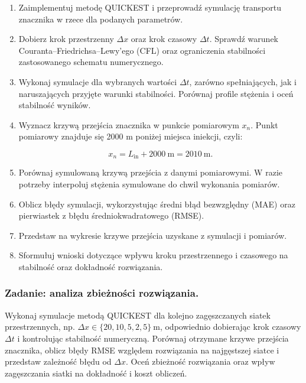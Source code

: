 \documentclass[
  polish,
  letterpaper,
  DIV=11,
  numbers=noendperiod]{scrartcl}
\begin{document}
\begin{enumerate}
\def\labelenumi{\arabic{enumi}.}
\item
  Zaimplementuj metodę QUICKEST i przeprowadź symulację transportu
  znacznika w rzece dla podanych parametrów.
\item
  Dobierz krok przestrzenny \(\Delta x\) oraz krok czasowy \(\Delta t\).
  Sprawdź warunek Couranta--Friedrichsa--Lewy'ego (CFL) oraz
  ograniczenia stabilności zastosowanego schematu numerycznego.
\item
  Wykonaj symulacje dla wybranych wartości \(\Delta t\), zarówno
  spełniających, jak i naruszających przyjęte warunki stabilności.
  Porównaj profile stężenia i oceń stabilność wyników.
\item
  Wyznacz krzywą przejścia znacznika w punkcie pomiarowym \(x_n\). Punkt
  pomiarowy znajduje się 2000 m poniżej miejsca iniekcji, czyli:

  \[
  x_n=L_{\mathrm{in}}+2000\ \mathrm{m}=2010\ \mathrm{m}.
  \]
\item
  Porównaj symulowaną krzywą przejścia z danymi pomiarowymi. W razie
  potrzeby interpoluj stężenia symulowane do chwil wykonania pomiarów.
\item
  Oblicz błędy symulacji, wykorzystując średni błąd bezwzględny (MAE)
  oraz pierwiastek z błędu średniokwadratowego (RMSE).
\item
  Przedstaw na wykresie krzywe przejścia uzyskane z symulacji i
  pomiarów.
\item
  Sformułuj wnioski dotyczące wpływu kroku przestrzennego i czasowego na
  stabilność oraz dokładność rozwiązania.
\end{enumerate}

\subsubsection{Zadanie: analiza zbieżności
rozwiązania.}\label{zadanie-analiza-zbieux17cnoux15bci-rozwiux105zania.}

Wykonaj symulacje metodą QUICKEST dla kolejno zagęszczanych siatek
przestrzennych, np. \(\Delta x \in \{20, 10, 5, 2{,}5\}\ \mathrm{m}\),
odpowiednio dobierając krok czasowy \(\Delta t\) i kontrolując
stabilność numeryczną. Porównaj otrzymane krzywe przejścia znacznika,
oblicz błędy RMSE względem rozwiązania na najgęstszej siatce i przedstaw
zależność błędu od \(\Delta x\). Oceń zbieżność rozwiązania oraz wpływ
zagęszczania siatki na dokładność i koszt obliczeń.
\end{document}
